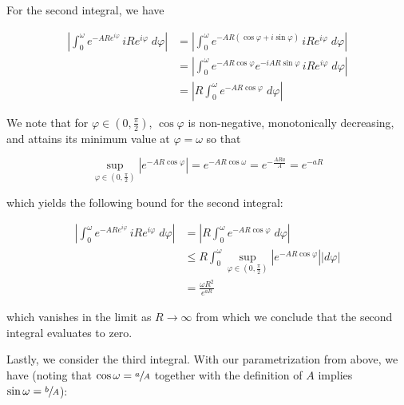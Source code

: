 \begin{solution}
    \pagebreak
    For the second integral, we have

    \begin{align*}
        \left| \int_0^{\omega} e^{-AR e^{i \varphi}} \, i R e^{i \varphi} \; d\varphi \right| 
        &= \left| \int_0^{\omega} e^{-AR (\cos \varphi + i \sin{\varphi})} \, i R e^{i \varphi} \; d\varphi \right| \\
        &= \left| \int_0^{\omega} e^{-AR \cos \varphi} e^{-i A R \sin{\varphi}} \, i R e^{i \varphi} \; d\varphi \right| \\
        &= \left| R \int_0^{\omega} e^{-AR \cos \varphi} \; d\varphi \right| 
    \end{align*}

    We note that for $\varphi \in \left(0, \frac{\pi}{2} \right)$, $\cos{\varphi}$ is non-negative, monotonically 
    decreasing, and attains its minimum value at $\varphi = \omega$ so that 
    
    $$
        \sup_{\varphi \in \left(0, \frac{\pi}{2} \right)} \left| e^{-A R \cos{\varphi}} \right| 
          = e^{-A R \cos{\omega}} 
          = e^{-\frac{A R a}{A}} 
          = e^{-a R}
    $$

    which yields the following bound for the second integral:

    \begin{align*}
        \left| \int_0^{\omega} e^{-AR e^{i \varphi}} \, i R e^{i \varphi} \; d\varphi \right| 
        &=   \left| R \int_0^{\omega} e^{-AR \cos \varphi} \; d\varphi \right|  \\
        &\le R \int_0^{\omega} \sup_{\varphi \in \left(0, \frac{\pi}{2} \right)} \left| e^{-A R \cos{\varphi}} \right| |d\varphi| \\
        &=  \frac{\omega R^2}{e^{aR}}
    \end{align*}

    which vanishes in the limit as $R \to \infty$ from which we conclude that the second integral evaluates to zero.

    Lastly, we consider the third integral. With our parametrization from above, we have (noting that 
    $\cos{\omega} = \sfrac{a}{A}$ together with the definition of $A$ implies $\sin{\omega} = \sfrac{b}{A}$):


\end{solution}
